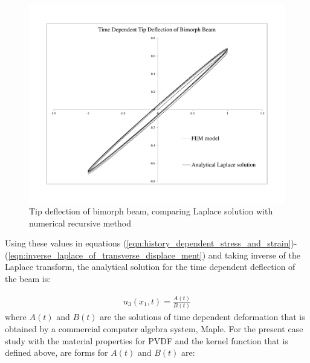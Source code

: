 \begin{figure}
\centering 
\includegraphics[trim = 0mm 20mm 0mm 20mm,
clip=true,width=7.0in]{./chap_4_structural_analyses/pdf_beam/result_tip_deflection_of_bimorph_beam.pdf}
\caption{Tip deflection of bimorph beam, comparing Laplace solution with numerical recursive method}
\label{fig:result_tip_deflection_of_bimorph_beam}
\end{figure}
Using these values in equations (\ref{eqn:history_dependent_stress_and_strain})-(\ref{eqn:inverse_laplace_of_transverse_displace_ment}) and taking inverse of the Laplace transform,
 the analytical solution for the time dependent deflection of the beam is:

\begin{equation}
\begin{aligned}
u_3(x_1,t)=\frac{A(t)}{B(t)}
\end{aligned}
\label{EQN:PVDF_beam_closed_form_solution}
\end{equation}
where $A(t)$ and $B(t)$ are the solutions of time dependent deformation that is obtained by a commercial computer algebra system, Maple.
For the present case study with the material properties for PVDF and the kernel function that is defined above, are forms for $A(t)$ and $B(t)$ are:


